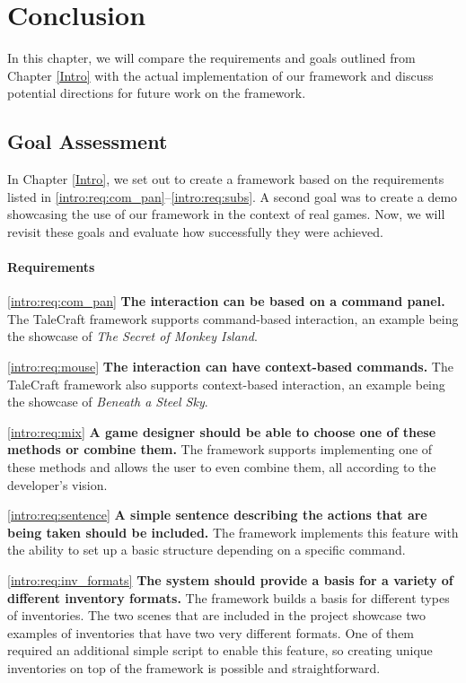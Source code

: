 \chapter{Conclusion}
In this chapter, we will compare the requirements and goals outlined from Chapter \ref{Intro} with the actual implementation of our framework and discuss potential directions for future work on the framework.


\section{Goal Assessment}
In Chapter \ref{Intro}, we set out to create a framework based on the requirements listed in \ref{intro:req:com_pan}--\ref{intro:req:subs}. A second goal was to create a demo showcasing the use of our framework in the context of real games. Now, we will revisit these goals and evaluate how successfully they were achieved.

\subsubsection{Requirements}
\ref{intro:req:com_pan} \quad \textbf{The interaction can be based on a command panel.} The TaleCraft framework supports command-based interaction, an example being the showcase of \textit{The Secret of Monkey Island}.

\ref{intro:req:mouse} \quad  \textbf{The interaction can have context-based commands. } The TaleCraft framework also supports context-based interaction, an example being the showcase of \textit{Beneath a Steel Sky}.

\ref{intro:req:mix} \quad  \textbf{A game designer should be able to choose one of these methods or combine them.} The framework supports implementing one of these methods and allows the user to even combine them, all according to the developer's vision.

\ref{intro:req:sentence} \quad  \textbf{A simple sentence describing the actions that are being taken should be included.} The framework implements this feature with the ability to set up a basic structure depending on a specific command.

\ref{intro:req:inv_formats} \quad  \textbf{The system should provide a basis for a variety of different inventory formats.} The framework builds a basis for different types of inventories. The two scenes that are included in the project showcase two examples of inventories that have two very different formats. One of them required an additional simple script to enable this feature, so creating unique inventories on top of the framework is possible and straightforward.

